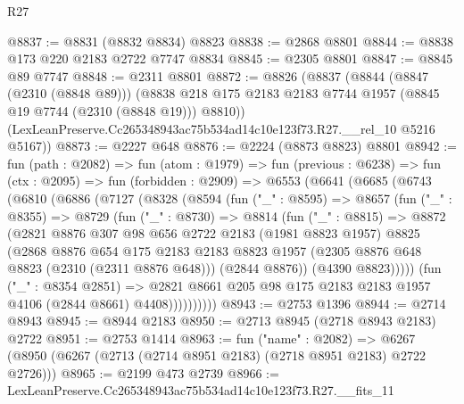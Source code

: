 \begin{lexlean}{R27}
\begin{coremodule}
@8837 := @8831 (@8832 @8834) @8823
@8838 := @2868 @8801
@8844 := @8838 @173 @220 @2183 @2722 @7747 @8834
@8845 := @2305 @8801
@8847 := @8845 @89 @7747
@8848 := @2311 @8801
@8872 := @8826
    (@8837
      (@8844
        (@8847 (@2310 (@8848 @89)))
        (@8838 @218 @175 @2183 @2183 @7744 @1957 (@8845 @19 @7744 (@2310 (@8848 @19))) @8810))
      (LexLeanPreserve.Cc265348943ac75b534ad14c10e123f73.R27.__rel_10 @5216 @5167))
@8873 := @2227 @648
@8876 := @2224 (@8873 @8823) @8801
@8942 := fun (path : @2082) =>
  fun (atom : @1979) =>
  fun (previous : @6238) =>
  fun (ctx : @2095) =>
  fun (forbidden : @2909) =>
  @6553
    (@6641
      (@6685
        (@6743
          (@6810
            (@6886
              (@7127
                (@8328
                  (@8594
                    (fun ("_" : @8595) =>
                    @8657
                      (fun ("_" : @8355) =>
                      @8729
                        (fun ("_" : @8730) =>
                        @8814
                          (fun ("_" : @8815) =>
                          @8872
                            (@2821
                              @8876
                              @307
                              @98
                              @656
                              @2722
                              @2183
                              (@1981 @8823 @1957)
                              @8825
                              (@2868
                                @8876
                                @654
                                @175
                                @2183
                                @2183
                                @8823
                                @1957
                                (@2305 @8876 @648 @8823 (@2310 (@2311 @8876 @648)))
                                (@2844 @8876))
                              (@4390 @8823)))))
                      (fun ("_" : @8354 @2851) =>
                      @2821
                        @8661
                        @205
                        @98
                        @175
                        @2183
                        @2183
                        @1957
                        @4106
                        (@2844 @8661)
                        @4408))))))))))
@8943 := @2753 @1396
@8944 := @2714 @8943
@8945 := @8944 @2183
@8950 := @2713 @8945 (@2718 @8943 @2183) @2722
@8951 := @2753 @1414
@8963 := fun ("name" : @2082) =>
  @6267 (@8950 (@6267 (@2713 (@2714 @8951 @2183) (@2718 @8951 @2183) @2722 @2726)))
@8965 := @2199 @473 @2739
@8966 := LexLeanPreserve.Cc265348943ac75b534ad14c10e123f73.R27.__fits_11

\end{coremodule}
\end{lexlean}
